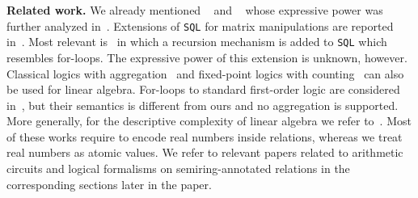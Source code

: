 %


\smallskip
\noindent
\textbf{Related work.} 
We already mentioned \lara~\cite{HutchisonHS17} and \lang~\cite{matlang-journal}
whose expressive power was further analyzed in~\cite{BarceloH0S20,brijder2019matrices,Geerts19,Geerts20}.
Extensions of \texttt{SQL} for matrix manipulations are reported in~\cite{Jermaine/17/LAonRA}. Most relevant
is~\cite{JankovLYCZJG19} in which a recursion mechanism is added to \texttt{SQL} which resembles for-loops.
The expressive power of this extension is unknown, however. Classical logics with aggregation~\cite{Hella:2001} and fixed-point logics with counting~\cite{GroheP17} can also be used for linear algebra. For-loops to standard first-order logic are considered in~\cite{NevenOTB01}, but their semantics is different from ours and no aggregation is supported.
More generally, for the descriptive complexity of linear algebra we refer to~\cite{dghl_rank,holm_phd}. Most of these works require to encode real numbers inside relations, whereas we treat real numbers as atomic values. We refer to relevant papers related to arithmetic circuits and logical formalisms on semiring-annotated relations in the corresponding sections later in the paper.


